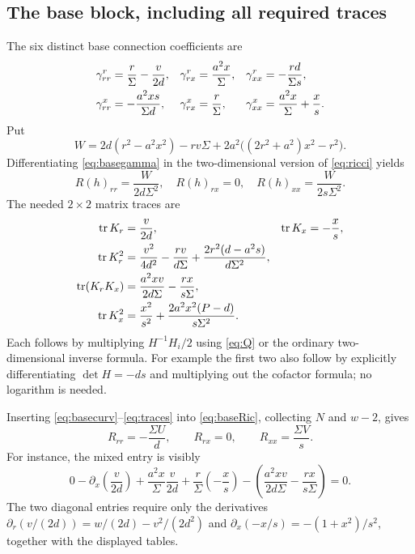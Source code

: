 \documentclass[11pt,a4paper]{article}
\numberwithin{equation}{section}
\theoremstyle{definition}\newtheorem{definition}[theorem]{Definition}
\theoremstyle{remark}\newtheorem{remark}[theorem]{Remark}
\newcommand{\tr}{\operatorname{tr}}
\begin{document}
\subsection{The base block, including all required traces}
The six distinct base connection coefficients are
\begin{align}
 \gamma^r_{rr}&=\frac r\Sigma-\frac v{2d},&
 \gamma^r_{rx}&=\frac{a^2x}{\Sigma},&
 \gamma^r_{xx}&=-\frac{rd}{\Sigma s},\notag\\
 \gamma^x_{rr}&=-\frac{a^2xs}{\Sigma d},&
 \gamma^x_{rx}&=\frac r\Sigma,&
 \gamma^x_{xx}&=\frac{a^2x}{\Sigma}+\frac xs.\label{eq:basegamma}
\end{align}
Put
\begin{equation}\label{eq:W}
 W=2d(r^2-a^2x^2)-rv\Sigma
       +2a^2\bigl((2r^2+a^2)x^2-r^2\bigr).
\end{equation}
Differentiating \eqref{eq:basegamma} in the two-dimensional version of \eqref{eq:ricci} yields
\begin{equation}
 R(h)_{rr}=\frac{W}{2d\Sigma^2},\quad R(h)_{rx}=0,\quad
 R(h)_{xx}=\frac{W}{2s\Sigma^2}.\label{eq:basecurv}
\end{equation}
The needed $2\times2$ matrix traces are
\begin{align}
 \tr K_r&=\frac v{2d},&\tr K_x&=-\frac xs,\notag\\
 \tr K_r^2&=\frac{v^2}{4d^2}-\frac{rv}{d\Sigma}
                   +\frac{2r^2(d-a^2s)}{d\Sigma^2},\label{eq:traces}\\
 \tr(K_rK_x)&=\frac{a^2xv}{2d\Sigma}-\frac{rx}{s\Sigma},\notag\\
 \tr K_x^2&=\frac{x^2}{s^2}+\frac{2a^2x^2(P-d)}{s\Sigma^2}.\notag
\end{align}
Each follows by multiplying $H^{-1}H_i/2$ using \eqref{eq:Q} or the ordinary two-dimensional inverse formula. For example the first two also follow by explicitly differentiating $\det H=-ds$ and multiplying out the cofactor formula; no logarithm is needed.

Inserting \eqref{eq:basecurv}--\eqref{eq:traces} into \eqref{eq:baseRic}, collecting $N$ and $w-2$, gives
\begin{equation}\label{eq:base-result}
 R_{rr}=-\frac{\Sigma U}{d},\qquad R_{rx}=0,\qquad
 R_{xx}=\frac{\Sigma V}{s}.
\end{equation}
For instance, the mixed entry is visibly
\[
 0-\partial_x\left(\frac v{2d}\right)
 +\frac{a^2x}{\Sigma}\frac v{2d}
 +\frac r\Sigma\left(-\frac xs\right)
 -\left(\frac{a^2xv}{2d\Sigma}-\frac{rx}{s\Sigma}\right)=0.
\]
The two diagonal entries require only the derivatives $\partial_r(v/(2d))=w/(2d)-v^2/(2d^2)$ and $\partial_x(-x/s)=-(1+x^2)/s^2$, together with the displayed tables.
\end{document}
